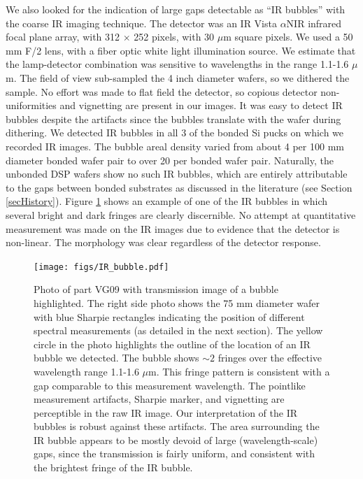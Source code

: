 \documentclass[osajnl,preprint,showpacs,superscriptaddress,12pt]{revtex4-1} %
\begin{document}
We also looked for the indication of large gaps detectable as ``IR bubbles'' \cite{1992JEMat..21..669M} with the coarse IR imaging technique.  The detector was an IR Vista $\alpha$NIR infrared focal plane array, with 312 $\times$ 252 pixels, with 30 $\mu$m square pixels.  We used a 50 mm F/2 lens, with a fiber optic white light illumination source.  We estimate that the lamp-detector combination was sensitive to wavelengths in the range 1.1-1.6 $\mu$m.  The field of view sub-sampled the 4 inch diameter wafers, so we dithered the sample.  No effort was made to flat field the detector, so copious detector non-uniformities and vignetting are present in our images.  It was easy to detect IR bubbles despite the artifacts since the bubbles translate with the wafer during dithering.  We detected IR bubbles in all 3 of the bonded Si pucks on which we recorded IR images.  The bubble areal density varied from about 4 per 100 mm diameter bonded wafer pair to over 20 per bonded wafer pair.  Naturally, the unbonded DSP wafers show no such IR bubbles, which are entirely attributable to the gaps between bonded substrates as discussed in the literature (see Section \ref{secHistory}).  Figure \ref{IRbubble} shows an example of one of the IR bubbles in which several bright and dark fringes are clearly discernible.  No attempt at quantitative measurement was made on the IR images due to evidence that the detector is non-linear.  The morphology was clear regardless of the detector response.  



\begin{figure}[htbp]
\centerline{\texttt{[image: figs/IR\_bubble.pdf]}}
\caption{Photo of part VG09 with transmission image of a bubble highlighted\label{IRbubble}.  The right side photo shows the 75 mm diameter wafer with blue Sharpie rectangles indicating the position of different spectral measurements (as detailed in the next section).  The yellow circle in the photo highlights the outline of the location of an IR bubble we detected.  The bubble shows $\sim2$ fringes over the effective wavelength range 1.1-1.6 $\mu$m.  This fringe pattern is consistent with a gap comparable to this measurement wavelength.  The pointlike measurement artifacts, Sharpie marker, and vignetting are perceptible in the raw IR image.  Our interpretation of the IR bubbles is robust against these artifacts.  The area surrounding the IR bubble appears to be mostly devoid of large (wavelength-scale) gaps, since the transmission is fairly uniform, and consistent with the brightest fringe of the IR bubble.  }
\end{figure}
\end{document}
